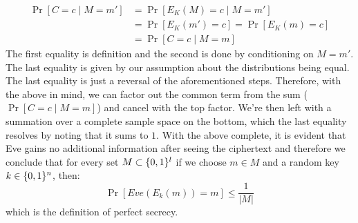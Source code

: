 \documentclass{article}
\begin{document}
\begin{enumerate}[noitemsep,topsep=\mdcompacttopsep,start=4]
\noindent\noindent\[%
\begin{aligned}
\Pr[C = c \mid M = m'] &= \Pr[E_K(M) = c \mid M = m'] \\
&= \Pr[E_K(m') = c] = \Pr[E_K(m) = c] \\
&= \Pr[C = c \mid M = m]
\end{aligned}
\]%
The first equality is definition and the second is done by conditioning on $M = m'$. The last equality is given
by our assumption about the distributions being equal. The last equality is just a reversal of the aforementioned steps.
Therefore, with the above in mind, we can factor out the common term from the sum ($\Pr[C = c \mid M = m]$) and cancel 
with the top factor. We're then left with a summation over a complete sample space on the bottom, which the last 
equality resolves by noting that it sums to $1$. 
With the above complete, it is evident that Eve gains no additional information after seeing the ciphertext
and therefore we conclude that for every set $M \subset \{0,1\}^l$ if we choose $m \in M$ and a random key
$k \in \{0,1\}^n$, then:
\noindent\noindent\[%
\Pr[Eve(E_k(m)) = m] \leq \frac{1}{|M|}
\]%
which is the definition of perfect secrecy.
\mdfloatright{\ensuremath{\Box}}


\end{enumerate}
\end{document}

